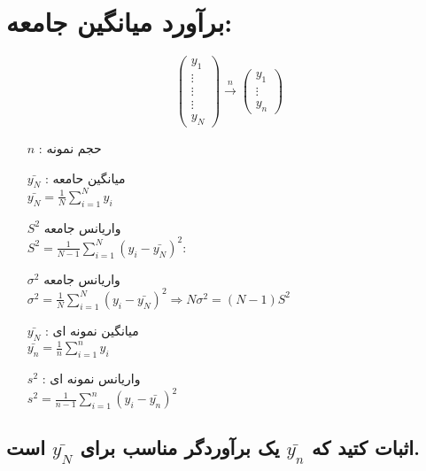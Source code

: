 \section*{برآورد میانگین جامعه: }
\begin{equation*}
	\begin{pmatrix}
		y_1 \\
		\vdots \\
		\vdots \\
		\vdots \\
		y_N
	\end{pmatrix}
	\overset{n}{\rightarrow}
	\begin{pmatrix}
		y_1 \\
		\vdots \\
		y_n
	\end{pmatrix}
\end{equation*}
\begin{itemize}
	\item[$n$]: حجم نمونه
	\item[$\bar{y_N}$]: میانگین حامعه \\
	$\bar{y_N}=\frac{1}{N}\sum_{i=1}^{N}y_i$
	\item[$S^2$] واریانس جامعه \\
	$S^2=\frac{1}{N-1}\sum_{i=1}^{N}(y_i-\bar{y_N})^2$:
	\item[$\sigma^2$] واریانس جامعه \\
	$\sigma^2=\frac{1}{N}\sum_{i=1}^{N}(y_i-\bar{y_N})^2 \Rightarrow N\sigma^2=(N-1)S^2$
	\item[$\bar{y_N}$]: میانگین نمونه ای \\
	$\bar{y_n}=\frac{1}{n}\sum_{i=1}^{n}y_i$
	\item[$s^2$]: واریانس نمونه ای \\
	$s^2=\frac{1}{n-1}\sum_{i=1}^{n}(y_i-\bar{y_n})^2$
\end{itemize}
\subsection*{اثبات کتید که 
	$\bar{y_n}$
	یک برآوردگر مناسب برای 
	$\bar{y_N}$
	است.
}
